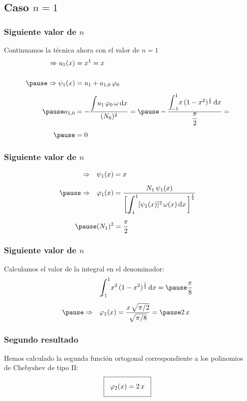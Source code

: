 \documentclass[12pt]{beamer}
\begin{document}
\subsection{Caso \texorpdfstring{$n=1$}{n=1}}

\begin{frame}
\frametitle{Siguiente valor de $n$}
Continuamos la técnica ahora con el valor de $n = 1$
\pause
\begin{eqnarray*}
\begin{aligned}
\Rightarrow u_{1} (x) &= x^{1} = x \\[0.5cm] \pause
\Rightarrow \psi_{1} (x) &=  u_{1} + a_{1,0} \, \varphi_{0} \\[0.5em] \pause
a_{1,0} &= - \dfrac{\scaleint{5ex} u_{1} \, \varphi_{0} \, \omega \dd{x}}{(N_{0})^{2}} = \pause
- \dfrac{\scaleint{5ex}_{\bs -1}^{1} x \, (1 - x^{2})^{\frac{1}{2}} \dd{x}}{\dfrac{\pi}{2}} = \\[0.5em] \pause
&= 0
\end{aligned}
\end{eqnarray*}    
\end{frame}
\begin{frame}
\frametitle{Siguiente valor de $n$}
\begin{eqnarray*}
\begin{aligned}
\Rightarrow \quad &\psi_{1} (x) =  x \\[0.5em] \pause
\Rightarrow \quad &\varphi_{1} (x) = \dfrac{N_{1} \, \psi_{1} (x)}{\bigg[ \scaleint{6ex}_{\bs \bs -1}^{1} [\psi_{1} (x)]^{2} \, \omega (x) \dd{x} \bigg]^{\frac{1}{2}}} \\[0.5em] \pause
&(N_{1})^{2} = \dfrac{\pi}{2}
\end{aligned}
\end{eqnarray*}    
\end{frame}
\begin{frame}
\frametitle{Siguiente valor de $n$}
Calculamos el valor de la integral en el denominador:
\pause
\begin{eqnarray*}
\begin{aligned}
&\scaleint{6ex}_{\bs \bs -1}^{1} x^{2} \, (1 - x^{2})^{\frac{1}{2}} \dd{x} = \pause \dfrac{\pi}{8} \\[0.4em] \pause
\Rightarrow \quad &\varphi_{1} (x) = \dfrac{x \, \sqrt{\pi/2}}{\sqrt{\pi/8}} = \pause 2 \, x
\end{aligned}
\end{eqnarray*}    
\end{frame}
\begin{frame}
\frametitle{Segundo resultado}
Hemos calculado la segunda función ortogonal correspondiente a los polinomios de Chebyshev de tipo II:
\pause
\begin{align*}
\setlength{\fboxsep}{3\fboxsep}\boxed{
\varphi_{2} (x) = 2 \, x}
\end{align*}
\end{frame}
\end{document}
